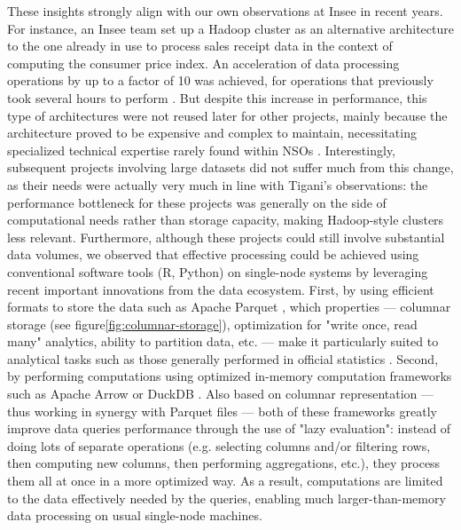 \documentclass[graybox]{svmult}
\begin{document}
These insights strongly align with our own observations at Insee in recent years. For instance, an Insee team set up a Hadoop cluster as an alternative architecture to the one already in use to process sales receipt data in the context of computing the consumer price index. An acceleration of data processing operations by up to a factor of 10 was achieved, for operations that previously took several hours to perform \cite{leclair2019utiliser}. But despite this increase in performance, this type of architectures were not reused later for other projects, mainly because the architecture proved to be expensive and complex to maintain, necessitating specialized technical expertise rarely found within NSOs \cite{vale2015international}. Interestingly, subsequent projects involving large datasets did not suffer much from this change, as their needs were actually very much in line with Tigani's observations: the performance bottleneck for these projects was generally on the side of computational needs rather than storage capacity, making Hadoop-style clusters less relevant. Furthermore, although these projects could still involve substantial data volumes, we observed that effective processing could be achieved using conventional software tools (R, Python) on single-node systems by leveraging recent important innovations from the data ecosystem. First, by using efficient formats to store the data such as Apache Parquet \cite{parquet2013}, which properties — columnar storage \cite{abadi2013design} (see figure\ref{fig:columnar-storage}), optimization for "write once, read many" analytics, ability to partition data, etc. — make it particularly suited to analytical tasks such as those generally performed in official statistics \cite{abdelaziz2023optimizing}. Second, by performing computations using optimized in-memory computation frameworks such as Apache Arrow \cite{arrow2016} or DuckDB \cite{raasveldt2019duckdb}. Also based on columnar representation — thus working in synergy with Parquet files — both of these frameworks greatly improve data queries performance through the use of "lazy evaluation": instead of doing lots of separate operations (e.g. selecting columns and/or filtering rows, then computing new columns, then performing aggregations, etc.), they process them all at once in a more optimized way. As a result, computations are limited to the data effectively needed by the queries, enabling much larger-than-memory data processing on usual single-node machines.
\end{document}
